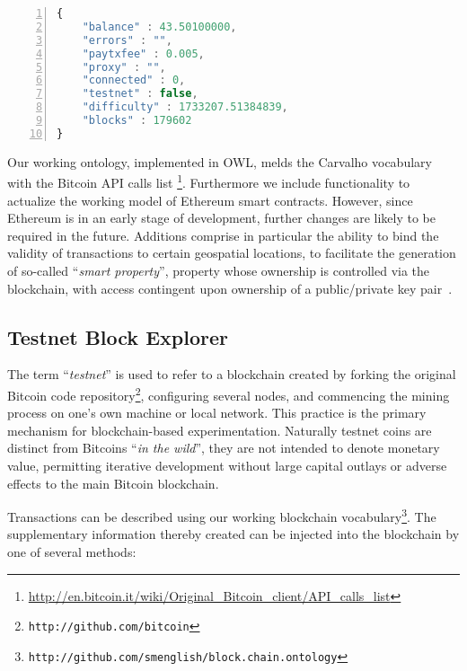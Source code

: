 \begin{lstlisting}[label=fig:api,caption=JSON Exploration API Output,language=Javascript,basicstyle=\scriptsize \ttfamily,numbers=left,numberstyle=\tiny\color{mygray}]
{
    "balance" : 43.50100000,
    "errors" : "",
    "paytxfee" : 0.005,
    "proxy" : "",
    "connected" : 0,
    "testnet" : false,
    "difficulty" : 1733207.51384839,
    "blocks" : 179602
}
\end{lstlisting}

Our working ontology, implemented in OWL, melds the Carvalho vocabulary with the Bitcoin API calls list \footnote{\url{http://en.bitcoin.it/wiki/Original_Bitcoin_client/API_calls_list}}.
Furthermore we include functionality to actualize the working model of Ethereum smart contracts. 
However, since Ethereum is in an early stage of development, further changes are likely to be required in the future.
Additions comprise in particular the ability to bind the validity of transactions to certain geospatial locations, to facilitate the generation of so-called ``\textit{smart property}'', property whose ownership is controlled via the blockchain, with access contingent upon ownership of a public/private key pair~\cite{szabo1997idea}.


\subsection{Testnet Block Explorer}

The term ``\textit{testnet}'' is used to refer to a blockchain created by forking the original Bitcoin code repository\footnote{\footnotesize{\texttt{http://github.com/bitcoin}}}, configuring several nodes, and commencing the mining process on one's own machine or local network. 
This practice is the primary mechanism for blockchain-based experimentation. 
Naturally testnet coins are distinct from Bitcoins ``\textit{in the wild}'', they are not intended to denote monetary value, permitting iterative development without large capital outlays or adverse effects to the main Bitcoin blockchain.

Transactions can be described using our working blockchain vocabulary\footnote{\footnotesize{\texttt{http://github.com/smenglish/block.chain.ontology}}}. 
The supplementary information thereby created can be injected into the blockchain by one of several methods: 


